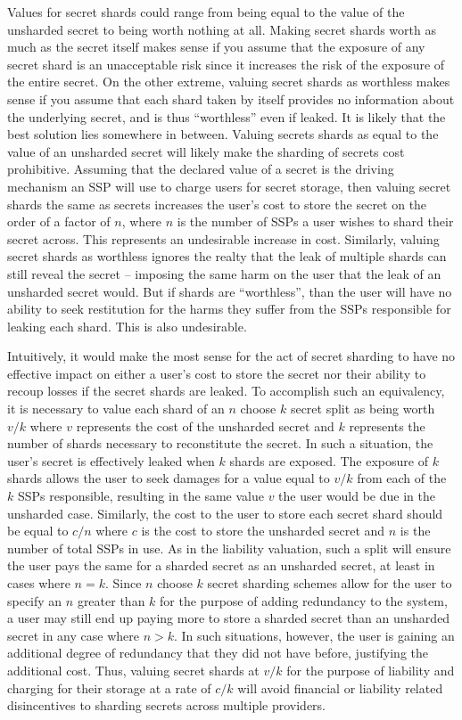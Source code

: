 Values for secret shards could range from being equal to the value of
the unsharded secret to being worth nothing at all. Making secret
shards worth as much as the secret itself makes sense if you assume
that the exposure of any secret shard is an unacceptable risk since it
increases the risk of the exposure of the entire secret. On the other
extreme, valuing secret shards as worthless makes sense if you assume
that each shard taken by itself provides no information about the
underlying secret, and is thus ``worthless'' even if leaked. It is
likely that the best solution lies somewhere in between. Valuing
secrets shards as equal to the value of an unsharded secret will
likely make the sharding of secrets cost prohibitive. Assuming that
the declared value of a secret is the driving mechanism an SSP will
use to charge users for secret storage, then valuing secret shards the
same as secrets increases the user's cost to store the secret on the
order of a factor of $n$, where $n$ is the number of SSPs a user
wishes to shard their secret across. This represents an undesirable
increase in cost. Similarly, valuing secret shards as worthless
ignores the realty that the leak of multiple shards can still reveal
the secret -- imposing the same harm on the user that the leak of an
unsharded secret would. But if shards are ``worthless'', than the user
will have no ability to seek restitution for the harms they suffer
from the SSPs responsible for leaking each shard. This is also
undesirable.

Intuitively, it would make the most sense for the act of secret
sharding to have no effective impact on either a user's cost to store
the secret nor their ability to recoup losses if the secret shards are
leaked. To accomplish such an equivalency, it is necessary to value
each shard of an $n$ choose $k$ secret split as being worth $v/k$
where $v$ represents the cost of the unsharded secret and $k$
represents the number of shards necessary to reconstitute the
secret. In such a situation, the user's secret is effectively leaked
when $k$ shards are exposed. The exposure of $k$ shards allows the
user to seek damages for a value equal to $v/k$ from each of the $k$
SSPs responsible, resulting in the same value $v$ the user would be
due in the unsharded case. Similarly, the cost to the user to store
each secret shard should be equal to $c/n$ where $c$ is the cost to
store the unsharded secret and $n$ is the number of total SSPs in
use. As in the liability valuation, such a split will ensure the user
pays the same for a sharded secret as an unsharded secret, at least in
cases where $n=k$. Since $n$ choose $k$ secret sharding schemes allow
for the user to specify an $n$ greater than $k$ for the purpose of
adding redundancy to the system, a user may still end up paying more
to store a sharded secret than an unsharded secret in any case where
$n>k$. In such situations, however, the user is gaining an additional
degree of redundancy that they did not have before, justifying the
additional cost. Thus, valuing secret shards at $v/k$ for the purpose
of liability and charging for their storage at a rate of $c/k$ will
avoid financial or liability related disincentives to sharding secrets
across multiple providers.

